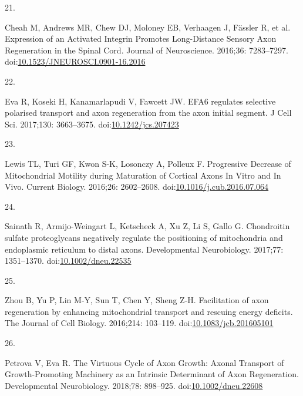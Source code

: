 \documentclass[
  12pt,
  a4paper,
]{book}
\newlength{\cslhangindent}
\newlength{\csllabelwidth}
\newlength{\cslentryspacingunit} %
\newenvironment{CSLReferences}[2] %
 {%
  \setlength{\parindent}{0pt}
  \ifodd #1
  \let\oldpar\par
  \def\par{\hangindent=\cslhangindent\oldpar}
  \fi
  \setlength{\parskip}{#2\cslentryspacingunit}
 }%
 {}
\newcommand{\CSLLeftMargin}[1]{\parbox[t]{\csllabelwidth}{#1}}
\newcommand{\CSLRightInline}[1]{\parbox[t]{\linewidth - \csllabelwidth}{#1}\break}
\begin{document}
\begin{CSLReferences}{0}{0}
\leavevmode{}%
\CSLLeftMargin{21. }%
\CSLRightInline{Cheah M, Andrews MR, Chew DJ, Moloney EB, Verhaagen J, Fässler R, et al. Expression of an {Activated Integrin Promotes Long-Distance Sensory Axon Regeneration} in the {Spinal Cord}. Journal of Neuroscience. 2016;36: 7283--7297. doi:\href{https://doi.org/10.1523/JNEUROSCI.0901-16.2016}{10.1523/JNEUROSCI.0901-16.2016}}

\leavevmode{}%
\CSLLeftMargin{22. }%
\CSLRightInline{Eva R, Koseki H, Kanamarlapudi V, Fawcett JW. {EFA6} regulates selective polarised transport and axon regeneration from the axon initial segment. J Cell Sci. 2017;130: 3663--3675. doi:\href{https://doi.org/10.1242/jcs.207423}{10.1242/jcs.207423}}

\leavevmode{}%
\CSLLeftMargin{23. }%
\CSLRightInline{Lewis TL, Turi GF, Kwon S-K, Losonczy A, Polleux F. Progressive {Decrease} of {Mitochondrial Motility} during {Maturation} of {Cortical Axons In Vitro} and {In Vivo}. Current Biology. 2016;26: 2602--2608. doi:\href{https://doi.org/10.1016/j.cub.2016.07.064}{10.1016/j.cub.2016.07.064}}

\leavevmode{}%
\CSLLeftMargin{24. }%
\CSLRightInline{Sainath R, Armijo-Weingart L, Ketscheck A, Xu Z, Li S, Gallo G. Chondroitin sulfate proteoglycans negatively regulate the positioning of mitochondria and endoplasmic reticulum to distal axons. Developmental Neurobiology. 2017;77: 1351--1370. doi:\href{https://doi.org/10.1002/dneu.22535}{10.1002/dneu.22535}}

\leavevmode{}%
\CSLLeftMargin{25. }%
\CSLRightInline{Zhou B, Yu P, Lin M-Y, Sun T, Chen Y, Sheng Z-H. Facilitation of axon regeneration by enhancing mitochondrial transport and rescuing energy deficits. The Journal of Cell Biology. 2016;214: 103--119. doi:\href{https://doi.org/10.1083/jcb.201605101}{10.1083/jcb.201605101}}

\leavevmode{}%
\CSLLeftMargin{26. }%
\CSLRightInline{Petrova V, Eva R. The {Virtuous Cycle} of {Axon Growth}: {Axonal Transport} of {Growth-Promoting Machinery} as an {Intrinsic Determinant} of {Axon Regeneration}. Developmental Neurobiology. 2018;78: 898--925. doi:\href{https://doi.org/10.1002/dneu.22608}{10.1002/dneu.22608}}


\end{CSLReferences}
\end{document}
